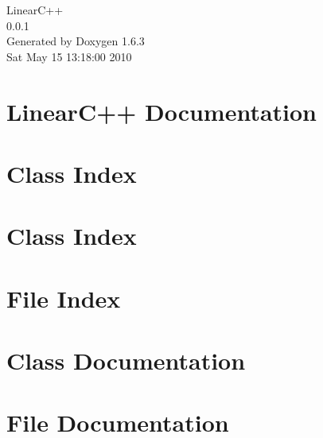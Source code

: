 \documentclass[a4paper]{book}
\begin{document}
\hypersetup{pageanchor=false}
\begin{titlepage}
\vspace*{7cm}
\begin{center}
{\Large LinearC++ \\[1ex]\large 0.0.1 }\\
\vspace*{1cm}
{\large Generated by Doxygen 1.6.3}\\
\vspace*{0.5cm}
{\small Sat May 15 13:18:00 2010}\\
\end{center}
\end{titlepage}
\clearemptydoublepage
{}
\tableofcontents
\clearemptydoublepage
{}
\hypersetup{pageanchor=true}
\chapter{LinearC++ Documentation}
\label{index}\hypertarget{index}{}
\chapter{Class Index}

\chapter{Class Index}

\chapter{File Index}

\chapter{Class Documentation}




\chapter{File Documentation}





\printindex
\end{document}
